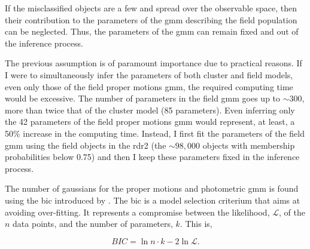 
If the misclassified objects are a few and spread over the observable space, then their contribution to the parameters of the \gls{gmm} describing the field population can be neglected. Thus, the parameters of the \gls{gmm} can remain fixed and out of the inference process. 

The previous assumption is of paramount importance due to practical reasons. If I were to simultaneously infer the parameters of both cluster and field models, even only those of the field proper motions \gls{gmm}, the required computing time would be excessive. The number of parameters in the field \gls{gmm} goes up to $\sim 300$, more than twice that of the cluster model (85 parameters). {Even inferring only the 42 parameters of the field proper motions \gls{gmm} would represent, at least, a 50\% increase in the computing time}. Instead, I first fit the parameters of the field \gls{gmm} using the field objects in the \gls{rdr2} (the $\sim 98,000$ objects with membership probabilities below 0.75) and then I keep these parameters fixed in the inference process.   

The number of gaussians for the proper motions and photometric \gls{gmm} is found using the \gls{bic} introduced by \citet{Schwarz1978}. The \gls{bic} is a model selection criterium that aims at avoiding over-fitting. It represents a compromise between the likelihood, $\mathcal{L}$, of the $n$ data points, and the number of parameters, $k$. This is,

\begin{equation}
\label{eq:BIC}
BIC = \ln{n}\cdot k - 2 \ln{\mathcal{L}}.
\end{equation}

